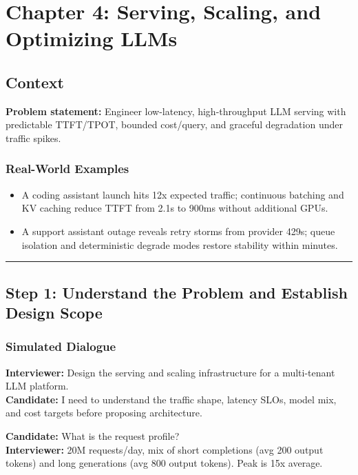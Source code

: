 \chapter{Chapter 4: Serving, Scaling, and Optimizing LLMs}

\section*{Context}

\textbf{Problem statement:} Engineer low-latency, high-throughput LLM serving with predictable TTFT/TPOT, bounded cost/query, and graceful degradation under traffic spikes.

\subsection*{Real-World Examples}

\begin{itemize}
  \item A coding assistant launch hits 12x expected traffic; continuous batching and KV caching reduce TTFT from 2.1s to 900ms without additional GPUs.
  \item A support assistant outage reveals retry storms from provider 429s; queue isolation and deterministic degrade modes restore stability within minutes.
\end{itemize}

\bigskip\hrule\bigskip

\section*{Step 1: Understand the Problem and Establish Design Scope}

\subsection*{Simulated Dialogue}

\textbf{Interviewer:} Design the serving and scaling infrastructure for a multi-tenant LLM platform.\\
\textbf{Candidate:} I need to understand the traffic shape, latency SLOs, model mix, and cost targets before proposing architecture.

\textbf{Candidate:} What is the request profile?\\
\textbf{Interviewer:} 20M requests/day, mix of short completions (avg 200 output tokens) and long generations (avg 800 output tokens). Peak is 15x average.

